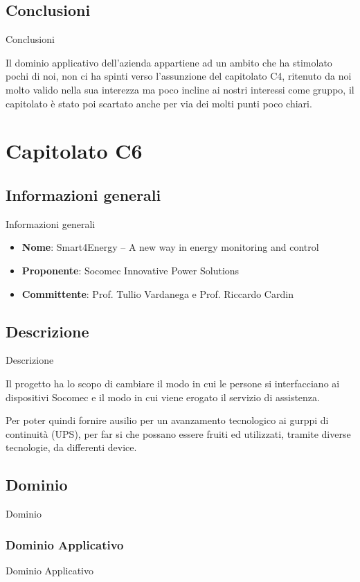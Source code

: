 \documentclass[11pt]{article}
\begin{document}
    \subsection{Conclusioni} Conclusioni
    
    Il dominio applicativo dell'azienda appartiene ad un ambito che ha stimolato pochi di noi, non ci ha spinti verso l'assunzione del capitolato C4, ritenuto da noi molto valido nella sua interezza ma poco incline ai nostri interessi come gruppo, il capitolato è stato poi scartato anche per via dei molti punti poco chiari.

\newpage

\section{Capitolato C6}
    \subsection{Informazioni generali} Informazioni generali
    \begin{itemize}
        \item \textbf{Nome}: Smart4Energy – A new way in energy monitoring and control
        \item \textbf{Proponente}: Socomec Innovative Power Solutions
        \item \textbf{Committente}: Prof. Tullio Vardanega e Prof. Riccardo Cardin
    \end{itemize}
    \subsection{Descrizione} Descrizione
    
    Il progetto ha lo scopo di cambiare il modo in cui le persone si interfacciano ai dispositivi Socomec e il modo in
    cui viene erogato il servizio di assistenza.
    
    Per poter quindi fornire ausilio per un avanzamento tecnologico ai gurppi di continuità (UPS), per far si che possano essere fruiti ed utilizzati, tramite diverse tecnologie, da differenti device.
    
    
    \subsection{Dominio} Dominio
        \subsubsection{Dominio Applicativo} Dominio Applicativo
        
\end{document}

